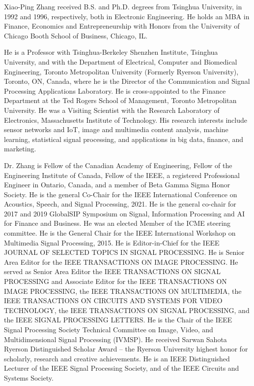 \documentclass[lettersize,journal]{IEEEtran}
\begin{document}
\begin{IEEEbiography}
 {Xiao-Ping Zhang}
received B.S. and Ph.D. degrees from Tsinghua University, in 1992 and 1996, respectively, both in Electronic Engineering. He holds an MBA in Finance, Economics and Entrepreneurship with Honors from the University of Chicago Booth School of Business, Chicago, IL. 

He is a Professor with Tsinghua-Berkeley Shenzhen Institute, Tsinghua University, and with the Department of Electrical, Computer and Biomedical Engineering, Toronto Metropolitan University (Formerly Ryerson University), Toronto, ON, Canada, where he is the Director of the Communication and Signal Processing Applications Laboratory. He is cross-appointed to the Finance Department at the Ted Rogers School of Management, Toronto Metropolitan University. He was a Visiting Scientist with the Research Laboratory of Electronics, Massachusetts Institute of Technology. His research interests include sensor networks and IoT, image and multimedia content analysis, machine learning, statistical signal processing, and applications in big data, finance, and marketing. 

Dr. Zhang is Fellow of the Canadian Academy of Engineering, Fellow of the Engineering Institute of Canada, Fellow of the IEEE, a registered Professional Engineer in Ontario, Canada, and a member of Beta Gamma Sigma Honor Society. He is the general Co-Chair for the IEEE International Conference on Acoustics, Speech, and Signal Processing, 2021. He is the general co-chair for 2017 and 2019 GlobalSIP Symposium on Signal, Information Processing and AI for Finance and Business. He was an elected Member of the ICME steering committee. He is the General Chair for the IEEE International Workshop on Multimedia Signal Processing, 2015. He is Editor-in-Chief for the IEEE JOURNAL OF SELECTED TOPICS IN SIGNAL PROCESSING. He is Senior Area Editor for the IEEE TRANSACTIONS ON IMAGE PROCESSING. He served as Senior Area Editor the IEEE TRANSACTIONS ON SIGNAL PROCESSING and Associate Editor for the IEEE TRANSACTIONS ON IMAGE PROCESSING, the IEEE TRANSACTIONS ON MULTIMEDIA, the IEEE TRANSACTIONS ON CIRCUITS AND SYSTEMS FOR VIDEO TECHNOLOGY, the IEEE TRANSACTIONS ON SIGNAL PROCESSING, and the IEEE SIGNAL PROCESSING LETTERS. He is the Chair of the IEEE Signal Processing Society Technical Committee on Image, Video, and Multidimensional Signal Processing (IVMSP). He received Sarwan Sahota Ryerson Distinguished Scholar Award -- the Ryerson University highest honor for scholarly, research and creative achievements. He is an IEEE Distinguished Lecturer of the IEEE Signal Processing Society, and of the IEEE Circuits and Systems Society. 
\end{IEEEbiography}
\vspace{-20pt}

\vfill
\end{document}
